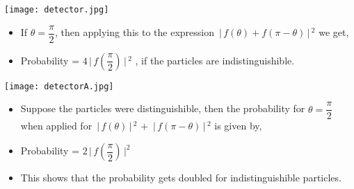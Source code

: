 \documentclass[aspectratio=169]{beamer}
\begin{document}
\begin{frame}

	\begin{multicols}{2}
 
  		\texttt{[image: detector.jpg]}
  
	\columnbreak
	
		\begin{itemize}

			\item If  $\theta = \dfrac{\pi}{2}$,  then applying this to the expression  $\,\Bigr\rvert\,f(\theta)+f(\pi-\theta)\,\Bigr\rvert\,^{2}$ we get, \newline
			\item Probability = $4 \,\Bigr\rvert\,f\left(\dfrac{\pi}{2}\right) \,\Bigr\rvert\,^{2}$ , if the particles are indistinguishible.
		
		\end{itemize}
	
	\end{multicols}

	
\end{frame}

\begin{frame}{}

	\begin{multicols}{2}
 
   		\texttt{[image: detectorA.jpg]}

	\columnbreak
	
		\begin{itemize}

			\item Suppose the particles were distinguishible, then the probability for $\theta = \dfrac{\pi}{2}$ when applied for $ \,\Bigr\rvert\,f(\theta) \,\Bigr\rvert\,^{2} $ + $ \,\Bigr\rvert\,f(\pi - \theta) \,\Bigr\rvert\,^{2} $ is given by, \newline
			\item Probability = $2 \,\Bigr\rvert\, f\left(\dfrac{\pi}{2}\right) \,\Bigr\rvert ^{2}$ \newline 
			\item This shows that the probability gets doubled for indistinguishible particles.

		\end{itemize}
	
	\end{multicols}

	
\end{frame}
\end{document}
